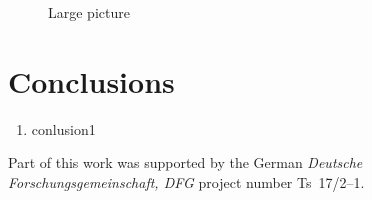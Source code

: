 \documentclass{aa}
\begin{document}
   \begin{figure*}
   \centering
   \caption{Large picture}%
    \end{figure*}
%

\section{Conclusions}

   \begin{enumerate}
      \item conlusion1
   \end{enumerate}

\begin{acknowledgements}
      Part of this work was supported by the German
      \emph{Deut\-sche For\-schungs\-ge\-mein\-schaft, DFG\/} project
      number Ts~17/2--1.
\end{acknowledgements}




%
\end{document}
